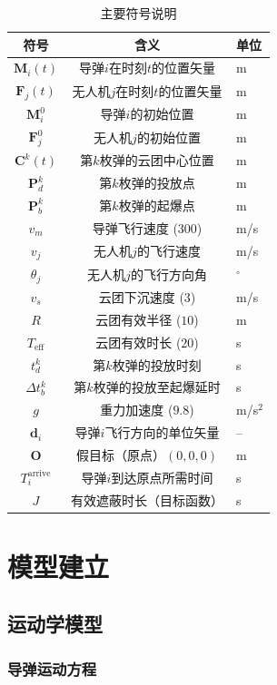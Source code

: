 \documentclass[12pt,a4paper]{ctexart}
\newcommand{\vect}[1]{\boldsymbol{#1}}
\begin{document}
\begin{table}[H]
\centering
\caption{主要符号说明}
\label{tab:symbols}
\begin{tabular}{ccl}
\toprule
符号 & 含义 & 单位 \\
\midrule
$\vect{M}_i(t)$ & 导弹$i$在时刻$t$的位置矢量 & m \\
$\vect{F}_j(t)$ & 无人机$j$在时刻$t$的位置矢量 & m \\
$\vect{M}_i^0$ & 导弹$i$的初始位置 & m \\
$\vect{F}_j^0$ & 无人机$j$的初始位置 & m \\
$\vect{C}^k(t)$ & 第$k$枚弹的云团中心位置 & m \\
$\vect{P}_d^k$ & 第$k$枚弹的投放点 & m \\
$\vect{P}_b^k$ & 第$k$枚弹的起爆点 & m \\
$v_m$ & 导弹飞行速度 ($300$) & m/s \\
$v_j$ & 无人机$j$的飞行速度 & m/s \\
$\theta_j$ & 无人机$j$的飞行方向角 & $^\circ$ \\
$v_s$ & 云团下沉速度 ($3$) & m/s \\
$R$ & 云团有效半径 ($10$) & m \\
$T_{\text{eff}}$ & 云团有效时长 ($20$) & s \\
$t_d^k$ & 第$k$枚弹的投放时刻 & s \\
$\Delta t_b^k$ & 第$k$枚弹的投放至起爆延时 & s \\
$g$ & 重力加速度 ($9.8$) & m/s$^2$ \\
$\vect{d}_i$ & 导弹$i$飞行方向的单位矢量 & -- \\
$\vect{O}$ & 假目标（原点）$(0,0,0)$ & m \\
$T_i^{\text{arrive}}$ & 导弹$i$到达原点所需时间 & s \\
$J$ & 有效遮蔽时长（目标函数） & s \\
\bottomrule
\end{tabular}
\end{table}

\section{模型建立}

\subsection{运动学模型}

\subsubsection{导弹运动方程}
\end{document}
